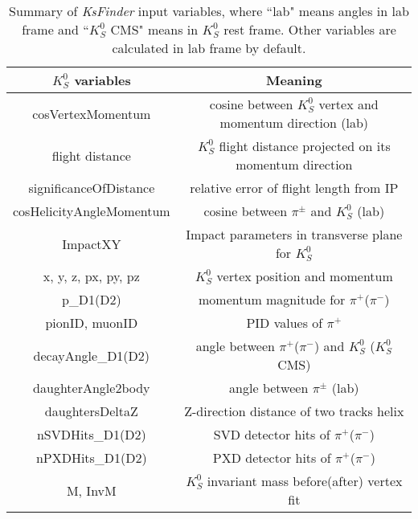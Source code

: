 \begin{table}[htbp]
	\centering 
	\small
	\begin{tabular}{|c|c|} 
		\hline
		$K_S^0$ variables &  Meaning \\
		\hline
		{cosVertexMomentum} & cosine between $K_S^0$ vertex and momentum direction (lab)\\
		flight distance & $K_S^0$ flight distance projected on its momentum direction\\
		significanceOfDistance & relative error of flight length from IP\\
		cosHelicityAngleMomentum & cosine between $\pi^{\pm}$ and $K_S^0$ (lab)\\
		ImpactXY & Impact parameters in transverse plane for $K_S^0$\\
		x, y, z, px, py, pz & $K_S^0$ vertex position and momentum\\
		p\_D1(D2) & momentum magnitude for $\pi^+$($\pi^-$)\\
		pionID, muonID & PID values of $\pi^+$\\
		decayAngle\_D1(D2) & angle between $\pi^+$($\pi^-$) and $K_S^0$ ($K_S^0$ CMS)\\
		daughterAngle2body & angle between $\pi^{\pm}$ (lab)\\
		daughtersDeltaZ & Z-direction distance of two tracks helix\\
		nSVDHits\_D1(D2)& SVD detector hits of  $\pi^+$($\pi^-$) \\
		nPXDHits\_D1(D2)& PXD detector hits of  $\pi^+$($\pi^-$) \\
		M, InvM & $K_S^0$ invariant mass before(after) vertex fit\\
		\hline
	\end{tabular}
	\caption{\small Summary of \textit{KsFinder} input variables, where ``lab" means angles in lab frame and  ``$K_S^0$ CMS" means in $K_S^0$ rest frame. Other variables are calculated in lab frame by default. }
	\label{tab:ks_vars}
\end{table}

